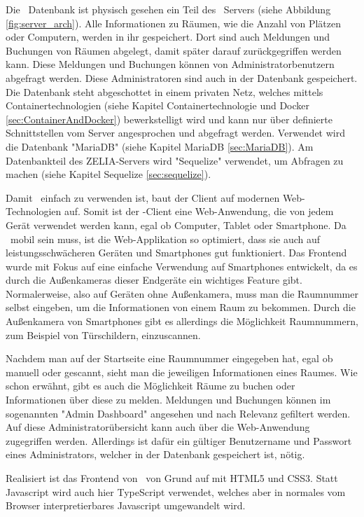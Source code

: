 Die \ZELIA\ Datenbank ist physisch gesehen ein Teil des \ZELIA\ Servers (siehe Abbildung \ref{fig:server_arch}). Alle Informationen zu Räumen, wie die Anzahl von Plätzen oder Computern, werden in ihr gespeichert. Dort sind auch Meldungen und Buchungen von Räumen abgelegt, damit später darauf zurückgegriffen werden kann. Diese Meldungen und Buchungen können von Administratorbenutzern abgefragt werden. Diese Administratoren sind auch in der Datenbank gespeichert. Die Datenbank steht abgeschottet in einem privaten Netz, welches mittels Containertechnologien (siehe Kapitel Containertechnologie und Docker \ref{sec:ContainerAndDocker}) bewerkstelligt wird und kann nur über definierte Schnittstellen vom Server angesprochen und abgefragt werden. Verwendet wird die Datenbank "MariaDB" (siehe Kapitel MariaDB \ref{sec:MariaDB}). Am Datenbankteil des ZELIA-Servers wird "Sequelize" verwendet, um Abfragen zu machen (siehe Kapitel Sequelize \ref{sec:sequelize}).



Damit \ZELIA\ einfach zu verwenden ist, baut der Client auf modernen Web-\linebreak Technologien auf. Somit ist der \ZELIA-Client eine Web-Anwendung,  die von jedem Gerät verwendet werden kann, egal ob Computer, Tablet oder Smartphone. Da \ZELIA\ mobil sein muss, ist die Web-Applikation so optimiert, dass sie auch auf leistungsschwächeren Geräten und Smartphones gut funktioniert. Das Frontend wurde mit Fokus auf eine einfache Verwendung auf Smartphones entwickelt, da es durch die Außenkameras dieser Endgeräte ein wichtiges Feature gibt. Normalerweise, also auf Geräten ohne Außenkamera, muss man die Raumnummer selbst eingeben, um die Informationen von einem Raum zu bekommen. Durch die Außenkamera von Smartphones gibt es allerdings die Möglichkeit Raumnummern, zum Beispiel von Türschildern, einzuscannen. 

Nachdem man auf der Startseite eine Raumnummer eingegeben hat, egal ob manuell oder gescannt, sieht man die jeweiligen Informationen eines Raumes. Wie schon erwähnt, gibt es auch die Möglichkeit Räume zu buchen oder Informationen über diese zu melden. Meldungen und Buchungen können im sogenannten "Admin Dashboard" angesehen und nach Relevanz gefiltert werden. Auf diese Administratorübersicht kann auch über die Web-Anwendung zugegriffen werden. Allerdings ist dafür ein gültiger Benutzername und Passwort eines Administrators, welcher in der Datenbank gespeichert ist, nötig.

Realisiert ist das Frontend von \ZELIA\ von Grund auf mit HTML5 und CSS3. Statt Javascript wird auch hier TypeScript verwendet, welches aber in normales vom Browser interpretierbares Javascript umgewandelt wird. 


